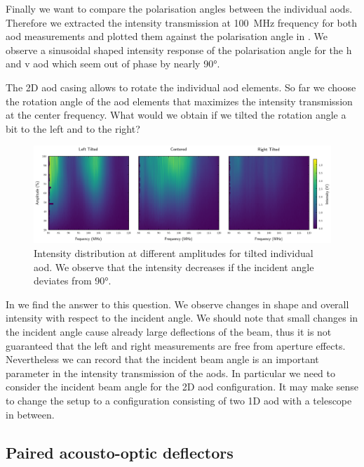 Finally we want to compare the polarisation angles between the individual
\gls{aod}s. Therefore we extracted the intensity transmission at
\SI{100}{\mega\hertz} frequency for both \gls{aod} measurements and plotted
them against the polarisation angle in . We
observe a sinusoidal shaped intensity response of the polarisation angle
for the \gls{h} and \gls{v} \gls{aod} which seem out of phase by nearly
\ang{90}.

The 2D \gls{aod} casing allows to rotate the individual \gls{aod} elements. So
far we choose the rotation angle of the \gls{aod} elements that maximizes the
intensity transmission at the center frequency. What would we obtain if we
tilted the rotation angle a bit to the left and to the right?
\begin{figure}[htb]
  \centering
  \includegraphics[width=\textwidth]
  {../figure/intensity/distribution/unpaired-tilted.png}
  \caption{Intensity distribution at different amplitudes for tilted
    individual \gls{aod}. We observe that the intensity decreases if the
    incident angle deviates from \ang{90}.
  }\label{fig:intensity_distribution_tilted}
\end{figure}
In  we find the answer to this
question. We observe changes in shape and overall intensity with respect
to the incident angle. We should note that small changes in the incident
angle cause already large deflections of the beam, thus it is not guaranteed
that the left and right measurements are free from aperture effects.
Nevertheless we can record that the incident beam angle is an important
parameter in the intensity transmission of the \gls{aod}s. In particular we
need to consider the incident beam angle for the 2D \gls{aod} configuration.
It may make sense to change the setup to a configuration consisting of two
1D \gls{aod} with a telescope in between.

\subsection{Paired acousto-optic deflectors}

